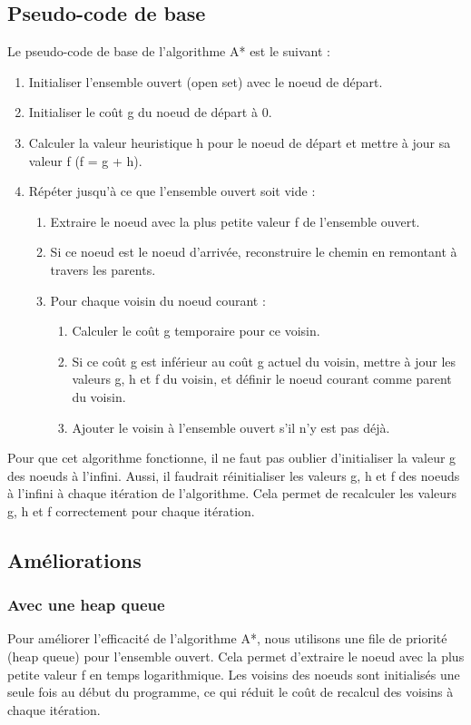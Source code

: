\subsection{Pseudo-code de base}
Le pseudo-code de base de l'algorithme A* est le suivant :
\begin{enumerate}
    \item Initialiser l'ensemble ouvert (open set) avec le noeud de départ.
    \item Initialiser le coût g du noeud de départ à 0.
    \item Calculer la valeur heuristique h pour le noeud de départ et mettre à jour sa valeur f (f = g + h).
    \item Répéter jusqu'à ce que l'ensemble ouvert soit vide :
    \begin{enumerate}
        \item Extraire le noeud avec la plus petite valeur f de l'ensemble ouvert.
        \item Si ce noeud est le noeud d'arrivée, reconstruire le chemin en remontant à travers les parents.
        \item Pour chaque voisin du noeud courant :
        \begin{enumerate}
            \item Calculer le coût g temporaire pour ce voisin.
            \item Si ce coût g est inférieur au coût g actuel du voisin, mettre à jour les valeurs g, h et f du voisin, et définir le noeud courant comme parent du voisin.
            \item Ajouter le voisin à l'ensemble ouvert s'il n'y est pas déjà.
        \end{enumerate}
    \end{enumerate}
\end{enumerate}

Pour que cet algorithme fonctionne, il ne faut pas oublier d'initialiser la valeur g des noeuds à l'infini. Aussi, il faudrait réinitialiser les valeurs g, h et f des noeuds à l'infini à chaque itération de l'algorithme. Cela permet de recalculer les valeurs g, h et f correctement pour chaque itération.

\subsection{Améliorations}
\subsubsection*{Avec une heap queue}
Pour améliorer l'efficacité de l'algorithme A*, nous utilisons une file de priorité (heap queue) pour l'ensemble ouvert. Cela permet d'extraire le noeud avec la plus petite valeur f en temps logarithmique. Les voisins des noeuds sont initialisés une seule fois au début du programme, ce qui réduit le coût de recalcul des voisins à chaque itération.

